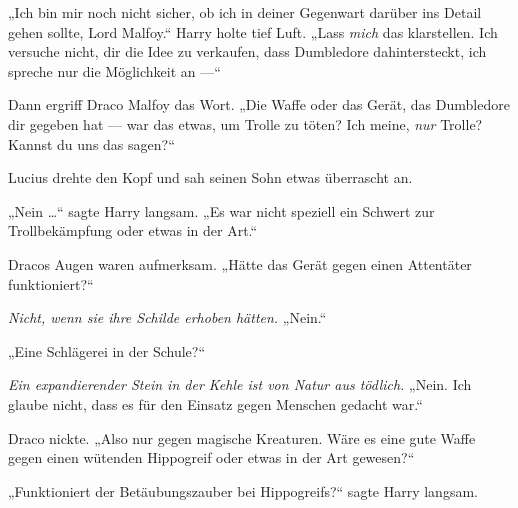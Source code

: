 „Ich bin mir noch nicht sicher, ob ich in deiner Gegenwart darüber ins Detail gehen sollte, Lord Malfoy.“
Harry holte tief Luft.
„Lass \emph{mich} das klarstellen. Ich versuche nicht, dir die Idee zu verkaufen, dass Dumbledore dahintersteckt, ich spreche nur die Möglichkeit an —“

Dann ergriff Draco Malfoy das Wort.
„Die Waffe oder das Gerät, das Dumbledore dir gegeben hat — war das etwas, um Trolle zu töten? Ich meine, \emph{nur} Trolle? Kannst du uns das sagen?“

Lucius drehte den Kopf und sah seinen Sohn etwas überrascht an.

„Nein …“ sagte Harry langsam.
„Es war nicht speziell ein Schwert zur Trollbekämpfung oder etwas in der Art.“

Dracos Augen waren aufmerksam.
„Hätte das Gerät gegen einen Attentäter funktioniert?“

\emph{Nicht, wenn sie ihre Schilde erhoben hätten.}
„Nein.“

„Eine Schlägerei in der Schule?“

\emph{Ein expandierender Stein in der Kehle ist von Natur aus tödlich.}
„Nein. Ich glaube nicht, dass es für den Einsatz gegen Menschen gedacht war.“

Draco nickte.
„Also nur gegen magische Kreaturen. Wäre es eine gute Waffe gegen einen wütenden Hippogreif oder etwas in der Art gewesen?“

„Funktioniert der Betäubungszauber bei Hippogreifs?“ sagte Harry langsam.


